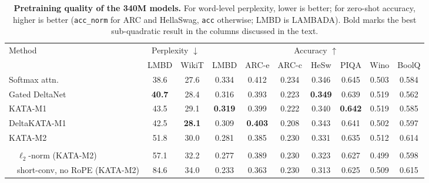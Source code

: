 \documentclass{article}
\newcommand{\1}{\bm{1}}
\theoremstyle{definition}
\begin{document}
\begin{table}[ht]
    \centering\footnotesize\setlength{\tabcolsep}{4pt}
  \begin{tabular}{ll|cc|ccccccc}
    \toprule
    \multicolumn{2}{l|}{\multirow{2}{*}{Method}} & \multicolumn{2}{c|}{Perplexity $\downarrow$} & \multicolumn{7}{c}{Accuracy $\uparrow$} \\
    \cmidrule(lr){3-4}\cmidrule(lr){5-11}
    \multicolumn{2}{l|}{}          & LMBD           & WikiT          & LMBD           & ARC-e          & ARC-c & HeSw           & PIQA           & Wino  & BoolQ \\
    \midrule
    \multicolumn{2}{l|}{Softmax attn.}          & 38.6           & 27.6           & 0.334          & 0.412          & 0.234 & 0.346          & 0.645          & 0.503 & 0.584 \\
    \multicolumn{2}{l|}{Gated DeltaNet}         & \textbf{40.7}  & 28.4           & 0.316          & 0.393          & 0.223 & \textbf{0.349} & 0.639          & 0.519 & 0.562 \\
    \midrule
    \multicolumn{2}{l|}{KATA-M1}     & 43.5           & 29.1           & \textbf{0.319} & 0.399          & 0.222 & 0.340          & \textbf{0.642} & 0.519 & 0.585 \\
    \multicolumn{2}{l|}{DeltaKATA-M1}    & 42.5           & \textbf{28.1}  & 0.309          & \textbf{0.403} & 0.208 & 0.343          & 0.641          & 0.502 & 0.597 \\
    \multicolumn{2}{l|}{KATA-M2}     & 51.8           & 30.0           & 0.281          & 0.385          & 0.230 & 0.331          & 0.635          & 0.512 & 0.614 \\
    \addlinespace[1pt]
    \multicolumn{2}{l|}{\emph{ablations:}}       &                &                &                &                &       &                &                &       &       \\
    \quad & $\ell_2$-norm (KATA-M2)             & 57.1           & 32.2           & 0.277          & 0.389          & 0.230 & 0.323          & 0.627          & 0.499 & 0.598 \\
    \quad & short-conv, no RoPE (KATA-M2)       & 84.6           & 34.0           & 0.233          & 0.363          & 0.230 & 0.313          & 0.625          & 0.509 & 0.615 \\
    \bottomrule
  \end{tabular}
    \caption{\textbf{Pretraining quality of the 340M models.}
    For word-level perplexity, lower is better; for zero-shot accuracy, higher is better
    (\texttt{acc\_norm} for ARC and HellaSwag, \texttt{acc} otherwise; LMBD is LAMBADA).
    Bold marks the best sub-quadratic result in the columns discussed in the text.}
    \label{tab:pretrain}
\end{table}
\end{document}
